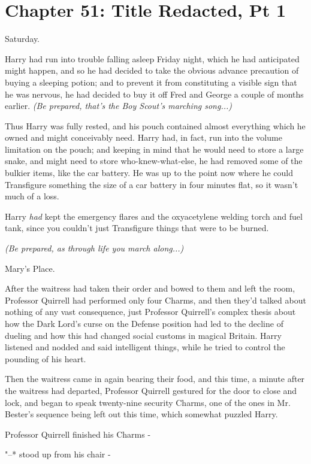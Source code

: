 \chapter{Chapter 51: Title Redacted, Pt 1}
Saturday.

Harry had run into trouble falling asleep Friday night, which he had
anticipated might happen, and so he had decided to take the obvious
advance precaution of buying a sleeping potion; and to prevent it from
constituting a visible sign that he was nervous, he had decided to buy
it off Fred and George a couple of months earlier. \emph{(Be prepared,
that's the Boy Scout's marching song...)}

Thus Harry was fully rested, and his pouch contained almost everything
which he owned and might conceivably need. Harry had, in fact, run into
the volume limitation on the pouch; and keeping in mind that he would
need to store a large snake, and might need to store who-knew-what-else,
he had removed some of the bulkier items, like the car battery. He was
up to the point now where he could Transfigure something the size of a
car battery in four minutes flat, so it wasn't much of a loss.

Harry \emph{had} kept the emergency flares and the oxyacetylene welding
torch and fuel tank, since you couldn't just Transfigure things that
were to be burned.

\emph{(Be prepared, as through life you march along...)}

Mary's Place.

After the waitress had taken their order and bowed to them and left the
room, Professor Quirrell had performed only four Charms, and then they'd
talked about nothing of any vast consequence, just Professor Quirrell's
complex thesis about how the Dark Lord's curse on the Defense position
had led to the decline of dueling and how this had changed social
customs in magical Britain. Harry listened and nodded and said
intelligent things, while he tried to control the pounding of his heart.

Then the waitress came in again bearing their food, and this time, a
minute after the waitress had departed, Professor Quirrell gestured for
the door to close and lock, and began to speak twenty-nine security
Charms, one of the ones in Mr. Bester's sequence being left out this
time, which somewhat puzzled Harry.

Professor Quirrell finished his Charms -

"--* stood up from his chair -

